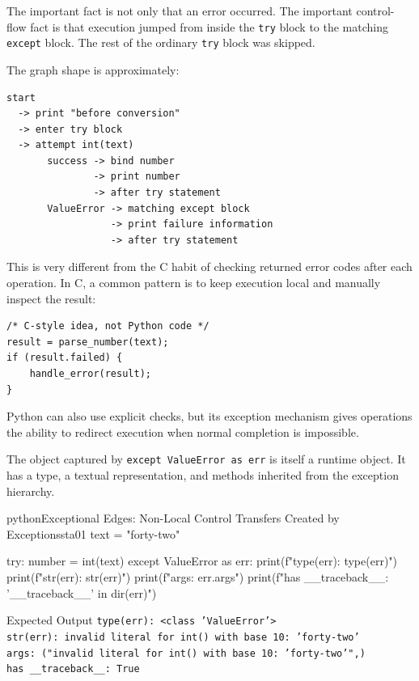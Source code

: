 The important fact is not only that an error occurred. The important control-flow fact is that execution jumped from inside the \texttt{try} block to the matching \texttt{except} block. The rest of the ordinary \texttt{try} block was skipped.

The graph shape is approximately:

\begin{verbatim}
start
  -> print "before conversion"
  -> enter try block
  -> attempt int(text)
       success -> bind number
               -> print number
               -> after try statement
       ValueError -> matching except block
                  -> print failure information
                  -> after try statement
\end{verbatim}

This is very different from the C habit of checking returned error codes after each operation. In C, a common pattern is to keep execution local and manually inspect the result:

\begin{verbatim}
/* C-style idea, not Python code */
result = parse_number(text);
if (result.failed) {
    handle_error(result);
}
\end{verbatim}

Python can also use explicit checks, but its exception mechanism gives operations the ability to redirect execution when normal completion is impossible.

The object captured by \texttt{except ValueError as err} is itself a runtime object. It has a type, a textual representation, and methods inherited from the exception hierarchy.

\begin{codebox}[]{python}{Exceptional Edges: Non-Local Control Transfers Created by Exceptions}{sta01}
text = "forty-two"

try:
    number = int(text)
except ValueError as err:
    print(f"type(err): {type(err)}")
    print(f"str(err): {str(err)}")
    print(f"args: {err.args}")
    print(f"has __traceback__: {'__traceback__' in dir(err)}")
\end{codebox}


\begin{iobox}{Expected Output}
\texttt{type(err): <class 'ValueError'>} \\
\texttt{str(err): invalid literal for int() with base 10: 'forty-two'} \\
\texttt{args: ("invalid literal for int() with base 10: 'forty-two'",)} \\
\texttt{has \_\_traceback\_\_: True} \\
\end{iobox}


